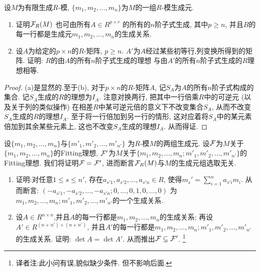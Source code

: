 \documentclass[oneside,a4papar,11pt,UTF8]{book}
\begin{document}
\begin{enumerate}[resume]
  \begin{prob}\label{ex-15-1-36}
  设$M$为有限生成$R$-模,
  $\{m_1,m_2,...,m_n\}$为$M$的一组$R$-模生成元.
    \begin{enumerate}
      \item 证明$\mathcal{F}_R(M)$
      也可由所有$A\in R^{p\times r}$
      的所有的$n$阶子式生成,
      其中$p\geq n$,
      并且$B$的每一行都是生成元$m_1,m_2,...,m_n$的生成关系.

      \item 设$A$为给定的$p\times n$的$R$-矩阵, $p\geq n$.
      $A'$为$A$经过某些初等行,列变换所得到的矩阵.
      证明: $R$的由$A$的所有$n$阶子式生成的理想
      与由$A'$的所有$n$阶子式生成的$R$理想相等.
    \end{enumerate}
  \end{prob}

  \begin{proof}
    (a)是显然的.至于(b),
    对于$p\times n$的$R$-矩阵$A$,
    记$S_A$为$A$的所有$n$阶子式构成的集合.
    记$S_A$生成的$R$的理想为$I_A$.
    注意对换两行,
    把其中一行倍乘$R$中的可逆元
    (以及关于列的类似操作)
    在相差$R$中某可逆元倍的意义下不改变集合$S_A$,
    从而不改变$S_A$生成的$R$的理想$I_A$.
    至于将一行倍加到另一行的情形,
    这对应着将$S_A$中的某元素倍加到其余某些元素上,
    这也不改变$S_A$生成的理想$I_A$.
    从而得证.
  \end{proof}

  \begin{prob}\label{ex-15-1-37}
    设$\{m_1,m_2,...,m_n\}$与$\{m'_1,m'_2,...,m'_{n'}\}$
    为$R$-模$M$的两组生成元.
    设$\mathcal{F}$为$M$关于$\{m_1,m_2,...,m_n\}$的Fitting理想,
    $\mathcal{F}'$为$M$关于$\{m_1,m_2,...,m_n;
    m'_1,m'_2,...,m'_{n'}\}$的Fitting理想.
    我们将证明$\mathcal{F}=\mathcal{F}'$,
    进而断言$\mathcal{F}_R(M)$与$M$的生成元组选取无关.
    \begin{enumerate}
      \item 证明:对任意$1\leq s\leq n'$,
      存在$a_{s'1},a_{s'2},...,a_{s'n}\in R$,
      使得$m_s'=\sum_{i=1}^{n}a_{s'i}m_i$.
      从而断言: $(-a_{s'1},-a_{s'2},...,-a_{s'n};0,...,0,1,0,...,0)$
      为$m_1,m_2,...,m_n; m'_1,m'_2,...,m'_{n'}$的一个生成关系.

      \item 设$A\in R^{n\times n}$,并且$A$的每一行都是$m_1,m_2,...,m_n$的生成关系;
      再设$A'\in R^{(n+n')\times(n+n')}$,
      并且$A'$的每一行都是$m_1,m_2,...,m_n; m'_1,m'_2,...,m'_{n'}$的生成关系.
      证明: $\det A=\det A'$.
      从而推出$\mathcal{F}\subseteq\mathcal{F}'$.
      \footnote{译者注:此小问有误,貌似缺少条件.
      但不影响后面.}


\end{enumerate}
\end{prob}
\end{enumerate}
\end{document}
